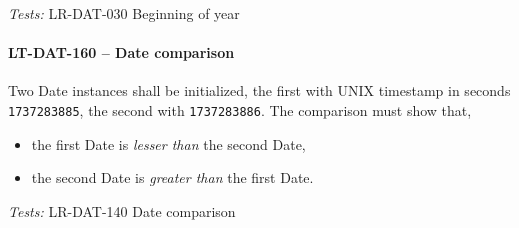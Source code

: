 \textit{Tests: } LR-DAT-030 Beginning of year

\paragraph{LT-DAT-160 -- Date comparison}
Two Date instances shall be initialized, the first with
UNIX timestamp in seconds \lstinline{1737283885}, the second with
\lstinline{1737283886}.
The comparison must show that,
\begin{itemize}
\item the first Date is \emph{lesser than} the second Date,
\item the second Date is \emph{greater than} the first Date.
\end{itemize}

\textit{Tests: } LR-DAT-140 Date comparison
